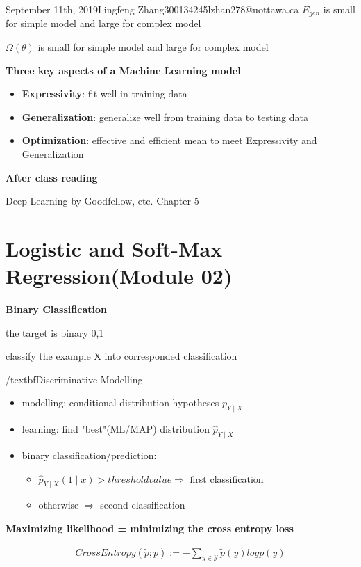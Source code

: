\documentclass{article}
\begin{document}
\begin{lecture}{September 11th, 2019}{Lingfeng Zhang}{300134245}{lzhan278@uottawa.ca}
$E_{gen}$ is small for simple model and large for complex model

$\Omega(\theta)$ is small for simple model and large for complex model

\textbf{Three key aspects of a Machine Learning model}

\begin{itemize}
    \item \textbf{Expressivity}: fit well in training data
    \item \textbf{Generalization}: generalize well from training data to testing data
    \item \textbf{Optimization}: effective and efficient mean to meet Expressivity and Generalization
\end{itemize}
    
\textbf{After class reading}

Deep Learning by Goodfellow, etc. Chapter 5

\section{Logistic and Soft-Max Regression(Module 02)}

\textbf{Binary Classification}

the target is binary {0,1}

classify the example X into corresponded classification

/textbf{Discriminative Modelling}

\begin{itemize}
\item modelling: conditional distribution hypotheses $p_{Y\mid X}$
\item learning:  find "best"(ML/MAP) distribution $\hat p_{Y\mid X}$
\item binary classification/prediction: 
	\begin{itemize}
	\item $\hat p_{Y\mid X}(1\mid x) > threshold value \Rightarrow$ first classification
	\item otherwise $\Rightarrow$ second classification
	\end{itemize}
\end{itemize}

\textbf{Maximizing likelihood = minimizing the cross entropy loss}

\begin{eqnarray}
CrossEntropy(\widetilde p; p) := - \sum_{y \in \mathcal{Y}} \tilde{p}(y) log p(y)
\end{eqnarray}


\end{lecture}
\end{document}
